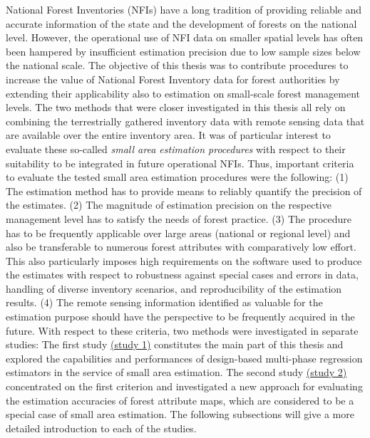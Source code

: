 National Forest Inventories (NFIs) have a long tradition of providing reliable and accurate information of the state and the development of forests on the national level. However, the operational use of NFI data on smaller spatial levels has often been hampered by insufficient estimation precision due to low sample sizes below the national scale. The objective of this thesis was to contribute procedures to increase the value of National Forest Inventory data for forest authorities by extending their applicability also to estimation on small-scale forest management levels. The two methods that were closer investigated in this thesis all rely on combining the terrestrially gathered inventory data with remote sensing data that are available over the entire inventory area. It was of particular interest to evaluate these so-called \textit{small area estimation procedures} with respect to their suitability to be integrated in future operational NFIs. Thus, important criteria to evaluate the tested small area estimation procedures were the following: (1) The estimation method has to provide means to reliably quantify the precision of the estimates. (2) The magnitude of estimation precision on the respective management level has to satisfy the needs of forest practice. (3) The procedure has to be frequently applicable over large areas (national or regional level) and also be transferable to numerous forest attributes with comparatively low effort. This also particularly imposes high requirements on the software used to produce the estimates with respect to robustness against special cases and errors in data, handling of diverse inventory scenarios, and reproducibility of the estimation results. (4) The remote sensing information identified as valuable for the estimation purpose should have the perspective to be frequently acquired in the future. With respect to these criteria, two methods were investigated in separate studies: The first study \hyperref[sec:study1]{(study 1)} constitutes the main part of this thesis and explored the capabilities and performances of design-based multi-phase regression estimators in the service of small area estimation. The second study \hyperref[sec:study2]{(study 2)} concentrated on the first criterion and investigated a new approach for evaluating the estimation accuracies of forest attribute maps, which are considered to be a special case of small area estimation. The following subsections will give a more detailed introduction to each of the studies.


